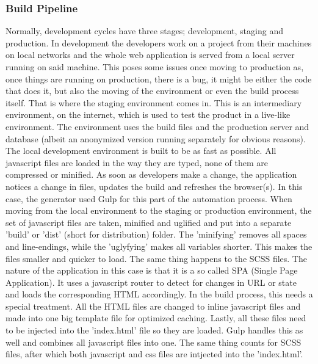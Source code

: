 \subsubsection{Build Pipeline}
Normally, development cycles have three stages; development, staging and production. In development the developers work on a project from their machines on local networks and the whole web application is served from a local server running on said machine. This poses some issues once moving to production as, once things are running on production, there is a bug, it might be either the code that does it, but also the moving of the environment or even the build process itself. That is where the staging environment comes in. This is an intermediary environment, on the internet, which is used to test the product in a live-like environment. The environment uses the build files and the production server and database (albeit an anonymized version running separately for obvious reasons).
\newline
The local development environment is built to be as fast as possible. All javascript files are loaded in the way they are typed, none of them are compressed or minified. As soon as developers make a change, the application notices a change in files, updates the build and refreshes the browser(s). In this case, the generator used Gulp for this part of the automation process.
\newline
When moving from the local environment to the staging or production environment, the set of javascript files are taken, minified and uglified and put into a separate 'build' or 'dist' (short for distribution) folder. The 'minifying' removes all spaces and line-endings, while the 'uglyfying' makes all variables shorter. This makes the files smaller and quicker to load. The same thing happens to the SCSS files.\newline
The nature of the application in this case is that it is a so called SPA (Single Page Application). It uses a javascript router to detect for changes in URL or state and loads the corresponding HTML accordingly. In the build process, this needs a special treatment. All the HTML files are changed to inline javascript files and made into one big template file for optimized caching.\newline
Lastly, all these files need to be injected into the 'index.html' file so they are loaded. Gulp handles this as well and combines all javascript files into one. The same thing counts for SCSS files, after which both javascript and css files are intjected into the 'index.html'.\newline
